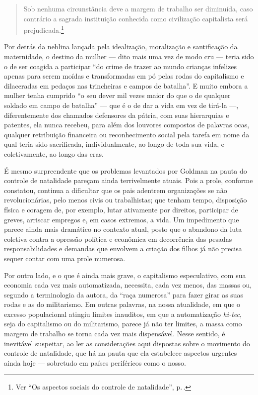 \begin{quote}
Sob nenhuma circunstância deve a margem de trabalho
ser diminuída, caso contrário a sagrada instituição conhecida como
civilização capitalista será prejudicada.\footnote{Ver ``Os aspectos sociais do controle de natalidade'', p.\,\pageref{margem}.}
\end{quote}

Por detrás da neblina
lançada pela idealização, moralização e santificação da maternidade, o
destino da mulher --- dito mais uma vez de modo cru --- teria sido o de
ser coagida a participar ``do crime de trazer ao mundo crianças
infelizes apenas para serem moídas e transformadas em pó pelas rodas do
capitalismo e dilaceradas em pedaços nas trincheiras e campos de
batalha''. E muito embora a mulher tenha cumprido ``o seu dever mil vezes maior do
que o de qualquer soldado em campo de batalha'' --- que é o de dar
a vida em vez de tirá-la ---, diferentemente dos chamados defensores da
pátria, com suas hierarquias e patentes, ela nunca recebeu, para além
dos louvores compostos de palavras ocas, qualquer retribuição financeira
ou reconhecimento social pela tarefa em nome da qual teria sido
sacrificada, individualmente, ao longo de toda sua vida, e
coletivamente, ao longo das eras.

É mesmo surpreendente que os problemas levantados por Goldman na pauta
do controle de natalidade pareçam ainda terrivelmente atuais. Pois a
prole, conforme constatou, continua a dificultar que os pais
adentrem organizações se não revolucionárias, pelo menos civis ou
trabalhistas; que tenham tempo, disposição física e coragem de, por
exemplo, lutar ativamente por direitos, participar de greves, arriscar
empregos e, em casos extremos, a vida. Um impedimento que parece ainda
mais dramático no contexto atual, posto que o abandono da luta coletiva
contra a opressão política e econômica em decorrência das pesadas
responsabilidades e demandas que envolvem a criação dos filhos já não
precisa sequer contar com uma prole numerosa.


Por outro lado, e o que é
ainda mais grave, o capitalismo especulativo, com sua economia cada vez
mais automatizada, necessita, cada vez menos, das massas ou, segundo a
terminologia da autora, da ``raça numerosa'' para fazer girar as suas
rodas e as do militarismo. Em outras palavras, na nossa atualidade, em
que o excesso populacional atingiu limites inauditos, em que a
automatização \emph{hi-tec}, seja do capitalismo ou do militarismo, parece
já não ter limites, a massa como margem de trabalho se torna cada vez
mais dispensável. Nesse sentido, é inevitável suspeitar, ao ler as
considerações aqui dispostas sobre o movimento do controle de
natalidade, que há na pauta que ela estabelece aspectos urgentes ainda
hoje --- sobretudo em países periféricos como o nosso. 

